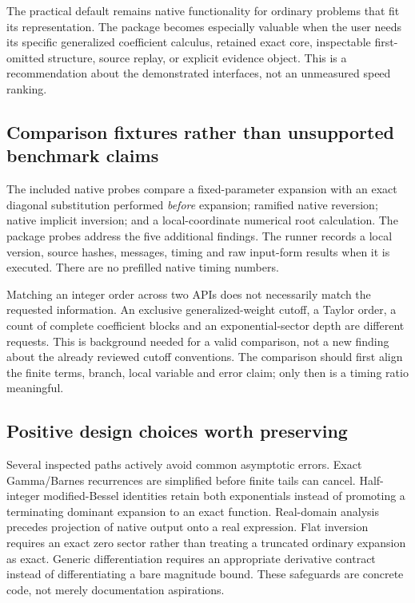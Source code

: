 \documentclass[11pt,a4paper]{article}
\begin{document}
The practical default remains native functionality for ordinary problems that fit its representation. The package becomes especially valuable when the user needs its specific generalized coefficient calculus, retained exact core, inspectable first-omitted structure, source replay, or explicit evidence object. This is a recommendation about the demonstrated interfaces, not an unmeasured speed ranking.

\subsection{Comparison fixtures rather than unsupported benchmark claims}

The included native probes compare a fixed-parameter expansion with an exact diagonal substitution performed \emph{before} expansion; ramified native reversion; native implicit inversion; and a local-coordinate numerical root calculation. The package probes address the five additional findings. The runner records a local version, source hashes, messages, timing and raw input-form results when it is executed. There are no prefilled native timing numbers.

Matching an integer order across two APIs does not necessarily match the requested information. An exclusive generalized-weight cutoff, a Taylor order, a count of complete coefficient blocks and an exponential-sector depth are different requests. This is background needed for a valid comparison, not a new finding about the already reviewed cutoff conventions. The comparison should first align the finite terms, branch, local variable and error claim; only then is a timing ratio meaningful.

\subsection{Positive design choices worth preserving}

Several inspected paths actively avoid common asymptotic errors. Exact Gamma/Barnes recurrences are simplified before finite tails can cancel. Half-integer modified-Bessel identities retain both exponentials instead of promoting a terminating dominant expansion to an exact function. Real-domain analysis precedes projection of native output onto a real expression. Flat inversion requires an exact zero sector rather than treating a truncated ordinary expansion as exact. Generic differentiation requires an appropriate derivative contract instead of differentiating a bare magnitude bound. These safeguards are concrete code, not merely documentation aspirations.\cite{gamma-forward,barnes-forward,identities,real-domain,flat,operations}
\end{document}

